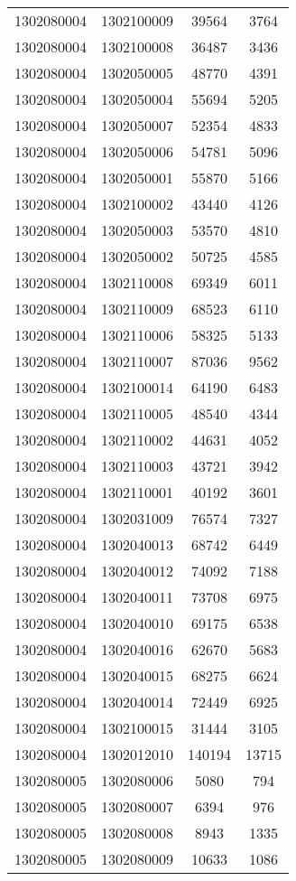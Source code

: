 \begin{longtable}{llcc}
1302080004 & 1302100009 & 39564 & 3764\\
1302080004 & 1302100008 & 36487 & 3436\\
1302080004 & 1302050005 & 48770 & 4391\\
1302080004 & 1302050004 & 55694 & 5205\\
1302080004 & 1302050007 & 52354 & 4833\\
1302080004 & 1302050006 & 54781 & 5096\\
1302080004 & 1302050001 & 55870 & 5166\\
1302080004 & 1302100002 & 43440 & 4126\\
1302080004 & 1302050003 & 53570 & 4810\\
1302080004 & 1302050002 & 50725 & 4585\\
1302080004 & 1302110008 & 69349 & 6011\\
1302080004 & 1302110009 & 68523 & 6110\\
1302080004 & 1302110006 & 58325 & 5133\\
1302080004 & 1302110007 & 87036 & 9562\\
1302080004 & 1302100014 & 64190 & 6483\\
1302080004 & 1302110005 & 48540 & 4344\\
1302080004 & 1302110002 & 44631 & 4052\\
1302080004 & 1302110003 & 43721 & 3942\\
1302080004 & 1302110001 & 40192 & 3601\\
1302080004 & 1302031009 & 76574 & 7327\\
1302080004 & 1302040013 & 68742 & 6449\\
1302080004 & 1302040012 & 74092 & 7188\\
1302080004 & 1302040011 & 73708 & 6975\\
1302080004 & 1302040010 & 69175 & 6538\\
1302080004 & 1302040016 & 62670 & 5683\\
1302080004 & 1302040015 & 68275 & 6624\\
1302080004 & 1302040014 & 72449 & 6925\\
1302080004 & 1302100015 & 31444 & 3105\\
1302080004 & 1302012010 & 140194 & 13715\\
1302080005 & 1302080006 & 5080 & 794\\
1302080005 & 1302080007 & 6394 & 976\\
1302080005 & 1302080008 & 8943 & 1335\\
1302080005 & 1302080009 & 10633 & 1086\\

\end{longtable}
